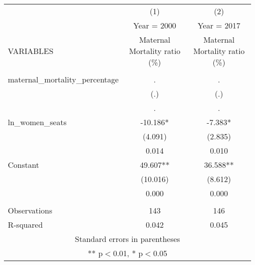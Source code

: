 \begin{tabular}{lcc} \hline
 & (1) & (2) \\
 & Year = 2000 & Year = 2017 \\
VARIABLES & Maternal Mortality ratio (\%) & Maternal Mortality ratio (\%) \\ \hline
 &  &  \\
maternal\_mortality\_percentage & . & . \\
 & (.) & (.) \\
 & . & . \\
ln\_women\_seats & -10.186* & -7.383* \\
 & (4.091) & (2.835) \\
 & 0.014 & 0.010 \\
Constant & 49.607** & 36.588** \\
 & (10.016) & (8.612) \\
 & 0.000 & 0.000 \\
 &  &  \\
Observations & 143 & 146 \\
 R-squared & 0.042 & 0.045 \\ \hline
\multicolumn{3}{c}{ Standard errors in parentheses} \\
\multicolumn{3}{c}{ ** p$<$0.01, * p$<$0.05} \\
\end{tabular}
